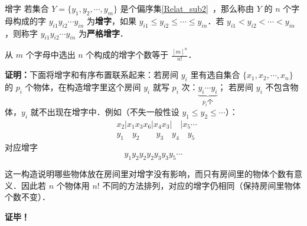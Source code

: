 \begin{definition}{增字}
若集合 $Y=\{y_1,y_2,\cdots,y_m\}$ 是个偏序集\autoref{Relat_sub2}~，那么称由 $Y$ 的 $n$ 个字母构成的字 $y_{i1}y_{i2}\cdots y_{in}$ 为\textbf{增字}，如果 $y_{i1}\leq y_{i2}\leq\cdots\leq y_{in}$．若 $y_{i1}<y_{i2}<\cdots<y_{in}$，则称字 $y_{i1}y_{i2}\cdots y_{in}$ 为\textbf{严格增字}．
\end{definition}
\begin{theorem}{}
从 $m$ 个字母中选出 $n$ 个构成的增字个数等于 $\frac{[m]^n}{n!}$．
\end{theorem}
\textbf{证明：}下面将增字和有序布置联系起来：若房间 $y_i$ 里有选自集合 $\{x_1,x_2,\cdots,x_n\}$ 的 $p_i$ 个物体，在构造增字里这个房间 $y_i$ 就写 $p_i$ 次：$\underbrace{y_i\cdots y_i}_{p_i\text{个}}$；
若房间 $y_i$ 不包含物体，$y_i$ 就不出现在增字中．例如（不失一般性设 $y_1\leq y_2\leq\cdots$）：
\begin{equation}
\begin{aligned}
&x_2| x_1 x_3 x_6|x_4 x_3|\quad|x_5\cdots\\
&y_1\quad y_2\qquad y_3\quad y_4\quad y_5
\end{aligned}
\end{equation}
对应增字
\begin{equation}
y_1y_2y_2y_2y_3y_3y_5\cdots
\end{equation}

这一构造说明哪些物体放在房间里对增字没有影响，而只有房间里的物体个数有意义．因此若 $n$ 个物体用 $n!$ 不同的方法排列，对应的增字仍相同（保持房间里物体个数不变）．

\textbf{证毕！}